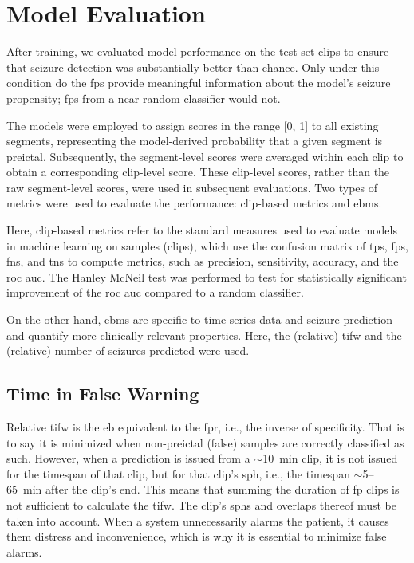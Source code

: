 \section{Model Evaluation} \label{sec:model-evaluation}
After training, we evaluated model performance on the test set clips to ensure that seizure detection was substantially better than chance. 
Only under this condition do the \glspl{fp} provide meaningful information about the model’s seizure propensity; \glspl{fp} from a near‑random classifier would not.


The models were employed to assign scores in the range [0, 1] to all existing segments, representing the model-derived probability that a given segment is preictal.  
Subsequently, the segment-level scores were averaged within each clip to obtain a corresponding clip-level score.  
These clip-level scores, rather than the raw segment-level scores, were used in subsequent evaluations.
Two types of metrics were used to evaluate the performance: clip-based metrics and \glspl{ebm}.

Here, clip-based metrics refer to the standard measures used to evaluate models in machine learning on samples (clips), which use the confusion matrix of \glspl{tp}, \glspl{fp}, \glspl{fn}, and \glspl{tn} to compute metrics, such as precision, sensitivity, accuracy, and the \gls{roc auc}.
The Hanley McNeil test \parencite{hanley_method_1983} was performed to test for statistically significant improvement of the \gls{roc auc} compared to a random classifier.

On the other hand, \glspl{ebm} are specific to time-series data and seizure prediction and quantify more clinically relevant properties.
Here, the (relative) \gls{tifw} \parencite{mormann_seizure_2007, eberlein_machine_2025} and the (relative) number of seizures predicted were used.

\subsection{Time in False Warning} \label{subsec:tifw}
Relative \gls{tifw} is the \gls{eb} equivalent to the \gls{fpr}, i.e., the inverse of specificity.
That is to say it is minimized when non-preictal (false) samples are correctly classified as such.
However, when a prediction is issued from a $\sim$\SI{10}{\minute} clip, it is not issued for the timespan of that clip, but for that clip's \gls{sph}, i.e., the timespan $\sim$\num{5}--\SI{65}{\minute} after the clip's end.
This means that summing the duration of \gls{fp} clips is not sufficient to calculate the \gls{tifw}.
The clip's \glspl{sph} and overlaps thereof must be taken into account.
When a system unnecessarily alarms the patient, it causes them distress and inconvenience, which is why it is essential to minimize false alarms.


